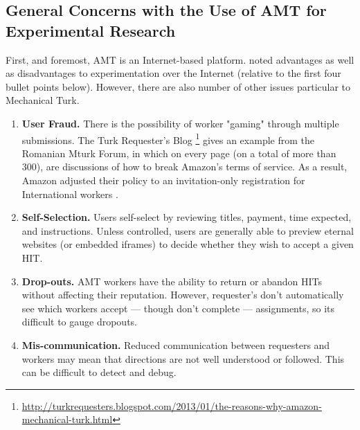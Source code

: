 \subsection{General Concerns with the Use of AMT for Experimental Research}
\label{generalconcernswiththeuseofamtforexperimentalresearch}

First, and foremost, AMT is an Internet-based platform.  \cite{Reips:2006bm}  noted advantages as well as disadvantages to experimentation over the Internet (relative to the first four bullet points below). However, there are also number of other issues particular to Mechanical Turk.

\begin{enumerate}
\item \textbf{User Fraud.} There is the possibility of worker "gaming" through multiple submissions. The Turk Requester's Blog \footnote{\url{http://turkrequesters.blogspot.com/2013/01/the-reasons-why-amazon-mechanical-turk.html}} gives an example from the Romanian Mturk Forum, in which on every page (on a total of more than 300), are discussions of how to break Amazon's terms of service. As a result, Amazon adjusted their policy to an invitation-only registration for International workers \citep{Chiarella:2013vz}.
\item \textbf{Self-Selection.} Users self-select by reviewing titles, payment, time expected, and instructions. Unless controlled, users are generally able to preview eternal websites (or embedded iframes) to decide whether they wish to accept a given HIT. 
\item \textbf{Drop-outs.} AMT workers have the ability to return or abandon HITs without affecting their reputation. However, requester's don't automatically see which workers accept --- though don't complete --- assignments, so its difficult to gauge dropouts. 
\item \textbf{Mis-communication.} Reduced communication between requesters and workers may mean that directions are not well understood or followed. This can be difficult to detect and debug.


\end{enumerate}
